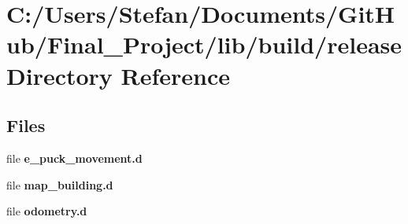 \section{C\-:/\-Users/\-Stefan/\-Documents/\-Git\-Hub/\-Final\-\_\-\-Project/lib/build/release Directory Reference}
\label{dir_e3922203bfa50458a49cf6aa1e1c3fd6}
\subsection*{Files}
\begin{DoxyCompactItemize}
\item 
file {\bf e\-\_\-puck\-\_\-movement.\-d}
\item 
file {\bf map\-\_\-building.\-d}
\item 
file {\bf odometry.\-d}
\end{DoxyCompactItemize}
